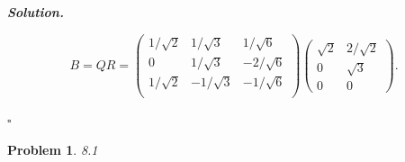 \documentclass[12pt]{report}
\newtheorem{problem}{Problem}
\newenvironment{solution}[1][\it{Solution}]{\textbf{#1. } }{$\square$}
\begin{document}
\begin{solution}
\begin{enumerate}
        \[
            B = QR = \begin{pmatrix}
                1/ \sqrt{2} & 1/ \sqrt{3} & 1/ \sqrt{6}\\
                0 & 1/\sqrt{3} & -2 / \sqrt{6}\\
                1/\sqrt{2} & -1/\sqrt{3} & - 1/\sqrt{6}\\
            \end{pmatrix}\begin{pmatrix}
                \sqrt{2} & 2/\sqrt{2}\\
                0 & \sqrt{3}\\
                0 & 0
            \end{pmatrix}.
        \]
    \end{enumerate}
\end{solution}

\newpage



\begin{problem}
    8.1
\end{problem}
\end{document}
